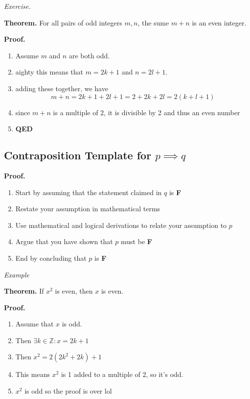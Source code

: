 \documentclass{article}
\begin{document}
\smallskip

\noindent\textit{Exercise.}

\textbf{Theorem.} For all pairs of odd integers $m, n$, the sume $m + n$ is an even integer.

\textbf{Proof.}
\begin{enumerate}
\item Assume $m$ and $n$ are both odd.
\item aighty this means that $m = 2k + 1$ and $n = 2l + 1$.
\item adding these together, we have $$m + n = 2k + 1 + 2l + 1 = 2 + 2k + 2l = 2(k + l + 1)$$
\item since $m+n$ is a multiple of 2, it is divisible by 2 and thus an even number
\item \textbf{QED}
\end{enumerate}

\subsection*{Contraposition Template for $p \implies q$}

\textbf{Proof.}
\begin{enumerate}
\item Start by assuming that the statement claimed in $q$ is \textbf{F}
\item Restate your assumption in mathematical terms
\item Use mathematical and logical derivations to relate your assumption to $p$
\item Argue that you have shown that $p$ must be \textbf{F}
\item End by concluding that $p$ is \textbf{F}
\end{enumerate}

\noindent\textit{Example}

\noindent\textbf{Theorem.} If $x^2$ is even, then $x$ is even.

\noindent\textbf{Proof.}
\begin{enumerate}
\item Assume that $x$ is odd.
\item Then $\exists k \in \mathbb{Z} : x = 2k + 1$
\item Then $x^2 = 2(2k^2 + 2k) + 1$
\item This means $x^2$ is 1 added to a multiple of 2, so it's odd.
\item $x^2$ is odd so the proof is over lol
\end{enumerate}
\end{document}
